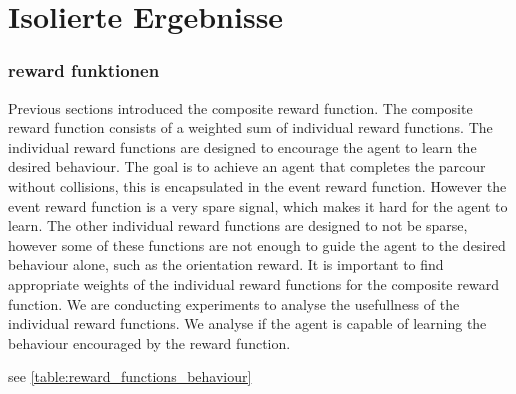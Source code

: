 \chapter{Isolierte Ergebnisse}
\label{cha:Isolierte Ergebnisse}


\subsection{reward funktionen}

Previous sections introduced the composite reward function. The composite reward function consists of a weighted sum of individual reward functions. The individual reward functions are designed to encourage the agent to learn the desired behaviour. The goal is to achieve an agent that completes the parcour without collisions, this is encapsulated in the event reward function. However the event reward function is a very spare signal, which makes it hard for the agent to learn. The other individual reward functions are designed to not be sparse, however some of these functions are not enough to guide the agent to the desired behaviour alone, such as the orientation reward.
It is important to find appropriate weights of the individual reward functions for the composite reward function. We are conducting experiments to analyse the usefullness of the individual reward functions. We analyse if the agent is capable of learning the behaviour encouraged by the reward function.

see \ref{table:reward_functions_behaviour}


